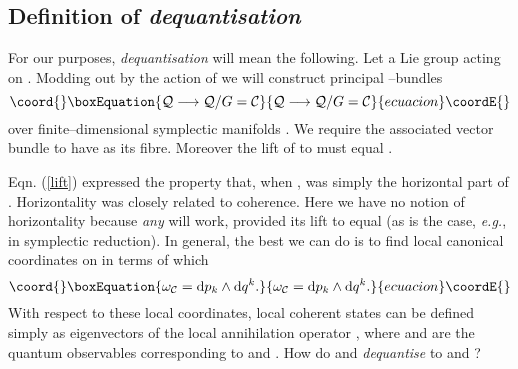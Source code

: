 \documentclass[a4paper,a4paper]{article}
\begin{document}
\subsection{Definition of {\it dequantisation}}\label{foli}

For our purposes, {\it dequantisation} will mean the following.
Let \coordHE{} a Lie group acting on \coordHE{}. Modding out by the action of \coordHE{}
we will construct principal \coordHE{}--bundles
\begin{equation}\coord{}\boxEquation{
{\cal Q}\longrightarrow {\cal Q}/G={\cal C}
\label{pri}
}{
{\cal Q}\longrightarrow {\cal Q}/G={\cal C}
}{ecuacion}\coordE{}\end{equation}
over finite--dimensional symplectic manifolds \coordHE{}.  We require 
the associated vector bundle to have \coordHE{} as its fibre. 
Moreover the lift of \coordHE{} to \coordHE{} 
must equal \coordHE{}. 

Eqn. (\ref{lift}) expressed the property that, when \coordHE{}, 
\coordHE{} was simply the horizontal part of \coordHE{}.
Horizontality was closely related to coherence. 
Here we have no notion of horizontality because {\it any} 
\coordHE{} will work, provided its lift to \coordHE{} 
equal \coordHE{} (as is the case, {\it e.g.}, in symplectic reduction).
In general, the best we can do is to find local canonical coordinates on \coordHE{} 
in terms of which 
\begin{equation}\coord{}\boxEquation{
\omega_{\cal C}={\rm d} p_k \wedge {\rm d} q^k.
\label{cano}
}{
\omega_{\cal C}={\rm d} p_k \wedge {\rm d} q^k.
}{ecuacion}\coordE{}\end{equation}
With respect to these local coordinates, local coherent states \coordHE{} 
can be defined simply as eigenvectors of the local annihilation operator 
\coordHE{}, where \coordHE{} and \coordHE{} are the quantum observables corresponding to 
\coordHE{} and \coordHE{}. How do \coordHE{} and \coordHE{} {\it dequantise} to \coordHE{} and \coordHE{}?
\end{document}
